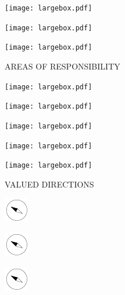 \documentclass[11pt,titlepage]{article}
\begin{document}
\noindent
\texttt{[image: largebox.pdf]}

\vspace{7,5mm}

\noindent
\texttt{[image: largebox.pdf]}

\vspace{7,5mm}

\noindent
\texttt{[image: largebox.pdf]}

\pagebreak

\small
\hfill AREAS OF RESPONSIBILITY

\vspace{6mm}

\noindent
\texttt{[image: largebox.pdf]}

\vspace{7,5mm}

\noindent
\texttt{[image: largebox.pdf]}

\vspace{7,5mm}

\noindent
\texttt{[image: largebox.pdf]}

\vspace{7,5mm}

\noindent
\texttt{[image: largebox.pdf]}

\vspace{7,5mm}

\noindent
\texttt{[image: largebox.pdf]}

\pagebreak

\small %
\hfill VALUED DIRECTIONS

\vspace{6mm}

\noindent
\hspace{1mm}\includegraphics[]{compass.pdf}

\vspace{12mm}

\noindent
\hspace{1mm}\includegraphics[]{compass.pdf}

\vspace{12mm}

\noindent
\hspace{1mm}\includegraphics[]{compass.pdf}
\end{document}

